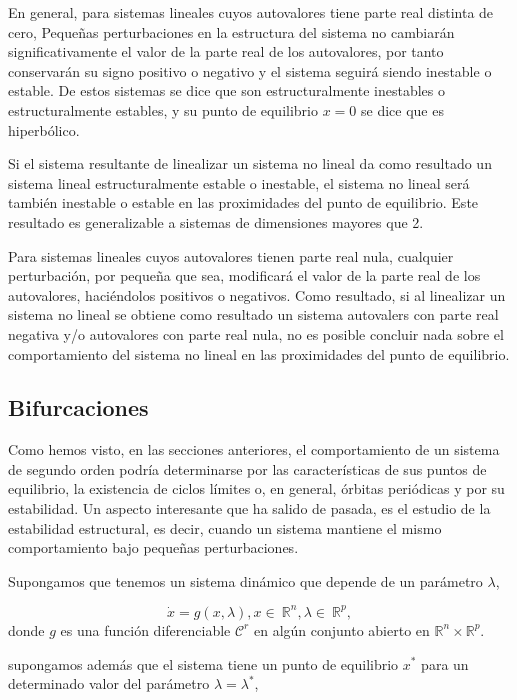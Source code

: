 En general, para sistemas lineales cuyos autovalores tiene parte real distinta de cero, Pequeñas perturbaciones en la estructura del sistema no cambiarán significativamente el valor de la parte real de los autovalores, por tanto conservarán su signo positivo o negativo y el sistema seguirá siendo inestable o estable. De estos sistemas se dice que son estructuralmente inestables o estructuralmente estables, y su punto de equilibrio $x=0$ se dice que es hiperbólico. 

Si el sistema resultante de linealizar un sistema no lineal da como resultado un sistema lineal estructuralmente estable o inestable, el sistema no lineal será también inestable o estable en las proximidades del punto de equilibrio. Este resultado es generalizable a sistemas de dimensiones mayores que 2.

Para  sistemas lineales cuyos autovalores tienen parte real nula, cualquier perturbación, por pequeña que sea, modificará el valor de la parte real de los autovalores, haciéndolos positivos o negativos. Como resultado, si al linealizar un sistema no lineal se obtiene como resultado un sistema autovalers con parte real negativa y/o  autovalores con parte real nula, no es posible concluir nada sobre el comportamiento del sistema no lineal en las proximidades del punto de equilibrio. 

\subsection{Bifurcaciones}

Como hemos visto, en las secciones anteriores, el comportamiento de un sistema de segundo orden podría determinarse por las características de sus puntos de equilibrio, la existencia de ciclos límites o, en general, órbitas periódicas y por su estabilidad.
Un aspecto interesante que ha salido de pasada, es el estudio de la estabilidad estructural, es decir,  cuando un sistema mantiene el mismo comportamiento bajo pequeñas perturbaciones.

Supongamos que tenemos un sistema dinámico que depende de un parámetro $\lambda$,

\begin{equation}
\dot x = g(x,\lambda), x \in \ \mathbb{R}^n, \lambda \in \ \mathbb{R}^p,
\end{equation}
donde $g$ es una función diferenciable $\mathcal{C}^r$ en algún conjunto abierto en $ \mathbb{R}^n \times  \mathbb{R}^p$.

supongamos además que el sistema tiene un punto de equilibrio $x^*$ para un determinado valor del parámetro $\lambda = \lambda^*$,

